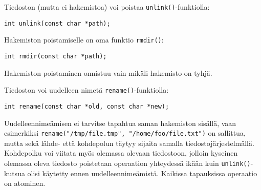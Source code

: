 Tiedoston (mutta ei hakemistoa) voi poistaa \texttt{unlink()}-funktiolla:
\begin{verbatim}
int unlink(const char *path);
\end{verbatim}
%
Hakemiston poistamiselle on oma funktio \texttt{rmdir()}:
%
\begin{verbatim}
int rmdir(const char *path);
\end{verbatim}
%
Hakemiston poistaminen onnistuu vain mikäli hakemisto on tyhjä.

Tiedoston voi uudelleen nimetä \texttt{rename()}-funktiolla:
%
\begin{verbatim}
int rename(const char *old, const char *new);
\end{verbatim}
%
Uudelleennimeämisen ei tarvitse tapahtua saman hakemiston sisällä,
vaan esimerkiksi \texttt{rename("/tmp/file.tmp", "/home/foo/file.txt")} on sallittua,
mutta sekä lähde- että kohdepolun täytyy sijaita samalla tiedostojärjestelmällä.
Kohdepolku voi viitata myös olemassa olevaan tiedostoon,
jolloin kyseinen olemassa oleva tiedosto poistetaan operaation yhteydessä ikään kuin \texttt{unlink()}-kutsua olisi käytetty ennen uudelleennimeämistä.
Kaikissa tapauksissa operaatio on atominen.

